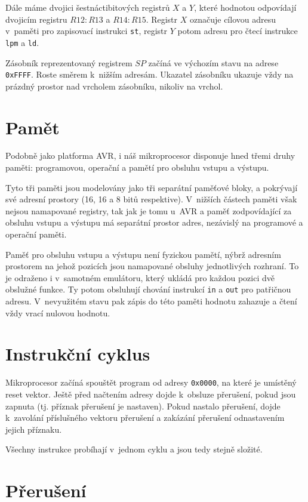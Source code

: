 Dále máme dvojici šestnáctibitových registrů $X$ a $Y$, které hodnotou odpovídají dvojicím registru $R12:R13$ a $R14:R15$. Registr $X$ označuje cílovou adresu v~paměti pro zapisovací instrukci \texttt{st}, registr $Y$ potom adresu pro čtecí instrukce \texttt{lpm} a \texttt{ld}.

Zásobník reprezentovaný registrem $SP$ začíná ve výchozím stavu na adrese \texttt{0xFFFF}. Roste směrem k~nižším adresám. Ukazatel zásobníku ukazuje vždy na prázdný prostor nad vrcholem zásobníku, nikoliv na vrchol.

\section{Pamět}

Podobně jako platforma AVR\cite{attiny12-datasheet}, i náš mikroprocesor disponuje hned třemi druhy paměti: programovou, operační a pamětí pro obsluhu vstupu a výstupu.

Tyto tři paměti jsou modelovány jako tři separátní paměťové bloky, a pokrývají své adresní prostory (16, 16 a 8 bitů respektive). V~nižších částech paměti však nejsou namapované registry, tak jak je tomu u~AVR\cite{attiny12-datasheet} a paměť zodpovídající za obsluhu vstupu a výstupu má separátní prostor adres, nezávislý na programové a operační paměti.

Paměť pro obsluhu vstupu a výstupu není fyzickou pamětí, nýbrž adresním prostorem na jehož pozicích jsou namapované obsluhy jednotlivých rozhraní. To je odraženo i v~samotném emulátoru, který ukládá pro každou pozici dvě obslužné funkce. Ty potom obsluhují chování instrukcí \texttt{in} a \texttt{out} pro patřičnou adresu. V~nevyužitém stavu pak zápis do této paměti hodnotu zahazuje a čtení vždy vrací nulovou hodnotu.

\section{Instrukční cyklus}

Mikroprocesor začíná spouštět program od adresy \texttt{0x0000}, na které je umístěný reset vektor. Ještě před načtením adresy dojde k~obsluze přerušení, pokud jsou zapnuta (tj. příznak přerušení je nastaven). Pokud nastalo přerušení, dojde k~zavolání příslušného vektoru přerušení a zakázání přerušení odnastavením jejich příznaku. 

Všechny instrukce probíhají v~jednom cyklu a jsou tedy stejně složité.

\section{Přerušení}

